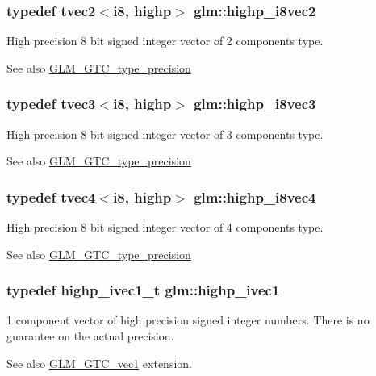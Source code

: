 \subsubsection[{highp\+\_\+i8vec2}]{\setlength{\rightskip}{0pt plus 5cm}typedef tvec2$<${\bf i8}, highp$>$ {\bf glm\+::highp\+\_\+i8vec2}}\label{namespaceglm_a4f10fdcaf6ec5d8229800fb4f089437a}
High precision 8 bit signed integer vector of 2 components type. \begin{DoxySeeAlso}{See also}
\hyperlink{group__gtc__type__precision}{G\+L\+M\+\_\+\+G\+T\+C\+\_\+type\+\_\+precision} 
\end{DoxySeeAlso}
\hypertarget{namespaceglm_a3261320a0a8cc8852e28f42bb6c02f18}{}
\subsubsection[{highp\+\_\+i8vec3}]{\setlength{\rightskip}{0pt plus 5cm}typedef tvec3$<${\bf i8}, highp$>$ {\bf glm\+::highp\+\_\+i8vec3}}\label{namespaceglm_a3261320a0a8cc8852e28f42bb6c02f18}
High precision 8 bit signed integer vector of 3 components type. \begin{DoxySeeAlso}{See also}
\hyperlink{group__gtc__type__precision}{G\+L\+M\+\_\+\+G\+T\+C\+\_\+type\+\_\+precision} 
\end{DoxySeeAlso}
\hypertarget{namespaceglm_a4bc8c9d417824225c6abbcbf3eb146c5}{}
\subsubsection[{highp\+\_\+i8vec4}]{\setlength{\rightskip}{0pt plus 5cm}typedef tvec4$<${\bf i8}, highp$>$ {\bf glm\+::highp\+\_\+i8vec4}}\label{namespaceglm_a4bc8c9d417824225c6abbcbf3eb146c5}
High precision 8 bit signed integer vector of 4 components type. \begin{DoxySeeAlso}{See also}
\hyperlink{group__gtc__type__precision}{G\+L\+M\+\_\+\+G\+T\+C\+\_\+type\+\_\+precision} 
\end{DoxySeeAlso}
\hypertarget{namespaceglm_addb6724b01f125e2730aeaad6130b06f}{}
\subsubsection[{highp\+\_\+ivec1}]{\setlength{\rightskip}{0pt plus 5cm}typedef highp\+\_\+ivec1\+\_\+t {\bf glm\+::highp\+\_\+ivec1}}\label{namespaceglm_addb6724b01f125e2730aeaad6130b06f}
1 component vector of high precision signed integer numbers. There is no guarantee on the actual precision. \begin{DoxySeeAlso}{See also}
\hyperlink{group__gtc__vec1}{G\+L\+M\+\_\+\+G\+T\+C\+\_\+vec1} extension. 
\end{DoxySeeAlso}
\hypertarget{namespaceglm_ac77ecf54fde34e33f934c6876ad807b3}{}
